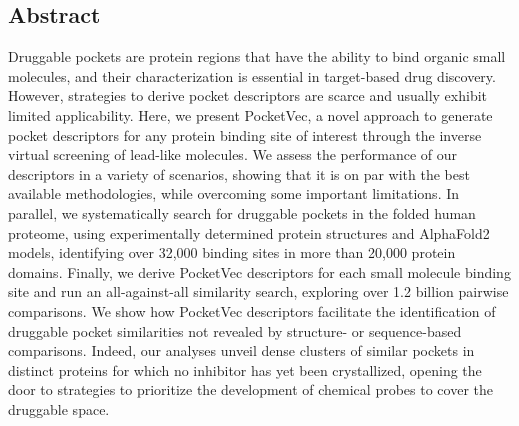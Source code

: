 \subsection{Abstract}

Druggable pockets are protein regions that have the ability to bind organic small molecules, and their characterization is essential in target-based drug discovery. However, strategies to derive pocket descriptors are scarce and usually exhibit limited applicability. Here, we present PocketVec, a novel approach to generate pocket descriptors for any protein binding site of interest through the inverse virtual screening of lead-like molecules. We assess the performance of our descriptors in a variety of scenarios, showing that it is on par with the best available methodologies, while overcoming some important limitations. In parallel, we systematically search for druggable pockets in the folded human proteome, using experimentally determined protein structures and AlphaFold2 models, identifying over 32,000 binding sites in more than 20,000 protein domains. Finally, we derive PocketVec descriptors for each small molecule binding site and run an all-against-all similarity search, exploring over 1.2 billion pairwise comparisons. We show how PocketVec descriptors facilitate the identification of druggable pocket similarities not revealed by structure- or sequence-based comparisons. Indeed, our analyses unveil dense clusters of similar pockets in distinct proteins for which no inhibitor has yet been crystallized, opening the door to strategies to prioritize the development of chemical probes to cover the druggable space.
